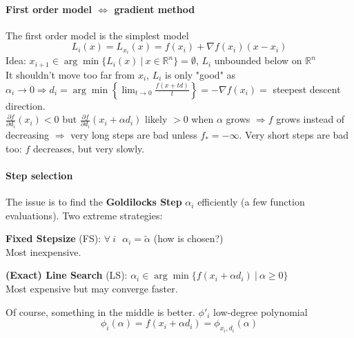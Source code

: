 \documentclass[10pt]{report}
\begin{document}
\paragraph{First order model $\Leftrightarrow$ gradient method} The first order model is the simplest model $$L_i(x) = L_{x_i}(x) = f(x_i) + \nabla f(x_i)(x-x_i)$$ Idea: $x_{i+1} \in \arg\min\{L_i(x)\:|\:x\in \mathbb{R}^n\} = \emptyset$, $L_i$ unbounded below on $\mathbb{R}^n$\\
It shouldn't move too far from $x_i$, $L_i$ is only "good" as $\alpha_i\rightarrow 0 \Rightarrow d_i = \arg\min\left\{\lim_{t\to 0} \frac{f(x+td)}{t}\right\} = -\nabla f(x_i) =$ steepest descent direction.\\
$\frac{\partial f}{\partial d_i}(x_i) < 0$ but $\frac{\partial f}{\partial d_i}(x_i + \alpha d_i)$ likely $> 0$ when $\alpha$ grows $\Rightarrow f$ grows instead of decreasing $\Rightarrow$ very long steps are bad unless $f_* = -\infty$. Very short steps are bad too: $f$ decreases, but very slowly.
\paragraph{Step selection} The issue is to find the \textbf{Goldilocks Step} $\alpha_i$ efficiently (a few function evaluations). Two extreme strategies:
\begin{list}{}{}
	\item \textbf{Fixed Stepsize} (FS): $\forall\:i\:\:\:\alpha_i = \tilde{\alpha}$ (how is chosen?)\\
	Most inexpensive.
	\item \textbf{(Exact) Line Search} (LS): $\alpha_i\in \arg\min\{f(x_i+\alpha d_i)\:|\:\alpha\geq 0\}$\\
	Most expensive but may converge faster.
\end{list}
Of course, something in the middle is better. $\phi'_i$ low-degree polynomial
$$\phi_i(\alpha) = f(x_i+\alpha d_i) = \phi_{x_i,d_i}(\alpha)$$
\end{document}
